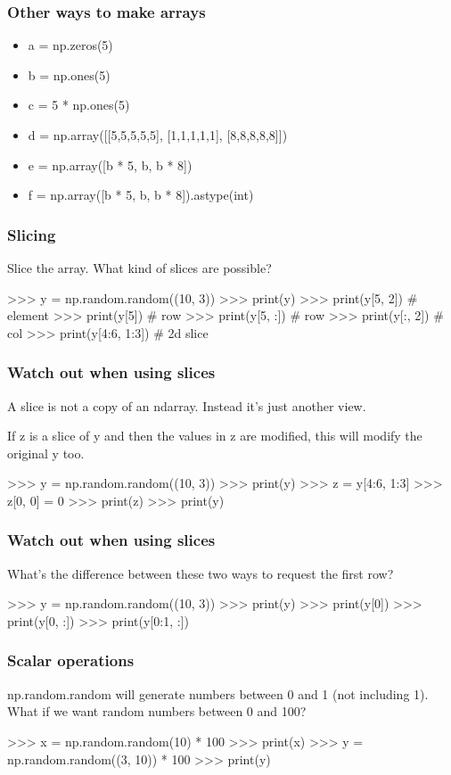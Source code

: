 \documentclass{beamer}
\begin{document}
\begin{frame}[fragile]
\frametitle{Other ways to make arrays}
\begin{itemize}
\item a = np.zeros(5)
\pause
\item b = np.ones(5)
\pause
\item c = 5 * np.ones(5)
\pause
\item d = np.array([[5,5,5,5,5], [1,1,1,1,1], [8,8,8,8,8]])
\pause 
\item e = np.array([b * 5, b, b * 8])
\pause
\item f = np.array([b * 5, b, b * 8]).astype(int)
\end{itemize}
\end{frame}

\begin{frame}[fragile]
\frametitle{Slicing}
Slice the array. What kind of slices are possible?
\begin{code}
>>> y = np.random.random((10, 3))
>>> print(y)
>>> print(y[5, 2])   # element
>>> print(y[5])    # row
>>> print(y[5, :])    # row
>>> print(y[:, 2])    # col
>>> print(y[4:6, 1:3])   # 2d slice
\end{code}
\end{frame}



\begin{frame}[fragile]
\frametitle{Watch out when using slices}
A slice is not a copy of an ndarray. Instead it's just another view.

\bigskip

If z is a slice of y and then the
values in z are modified, this will modify the original y too.

\begin{code}
>>> y = np.random.random((10, 3))
>>> print(y)
>>> z = y[4:6, 1:3]
>>> z[0, 0] = 0
>>> print(z)
>>> print(y)
\end{code}
\end{frame}


\begin{frame}[fragile]
\frametitle{Watch out when using slices}
What's the difference between these two ways to request the first row?
\begin{code}
>>> y = np.random.random((10, 3))
>>> print(y)
>>> print(y[0])
>>> print(y[0, :])
>>> print(y[0:1, :])
\end{code}
\end{frame}

\begin{frame}[fragile]
\frametitle{Scalar operations}
np.random.random will generate numbers between 0 and 1 (not including
1). What if we want random numbers between 0 and 100?
\begin{code}
>>> x = np.random.random(10) * 100
>>> print(x)
>>> y = np.random.random((3, 10)) * 100
>>> print(y)
\end{code}
\end{frame}
\end{document}
